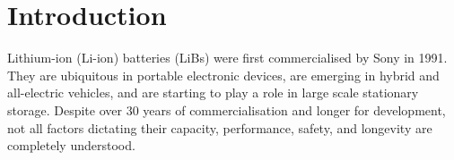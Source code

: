 \documentclass[../main.tex]{subfiles}
\begin{document}
\section{Introduction}
\label{sec:intro}




Lithium-ion (Li-ion) batteries (LiBs) were first commercialised by Sony in 1991. \cite{zeng2019commercialization} They are ubiquitous in portable electronic devices, are emerging in hybrid and all-electric vehicles, \cite{Goodenough2010} and are starting to play a role in large scale stationary storage. \cite{kubiak2017calendar} Despite over 30 years of commercialisation and longer for development, not all factors dictating their capacity, performance, safety, and longevity are completely understood. 
\end{document}
